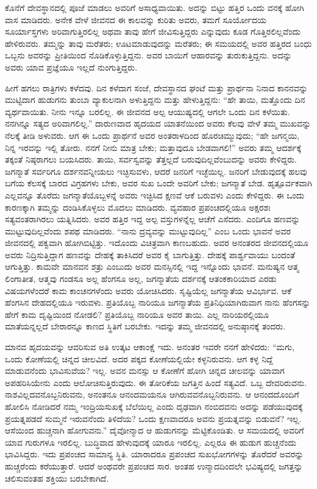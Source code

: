 ಕೊನೆಗೆ ದೇವಸ್ಥಾನದಲ್ಲಿ ಪೂಜೆ ಮಾಡಲು ಅವರಿಗೆ ಅಸಾಧ್ಯವಾಯಿತು. ಅದನ್ನು ಬಿಟ್ಟು ಹತ್ತಿರ ಒಂದು ವನಕ್ಕೆ ಹೋಗಿ ವಾಸ ಮಾಡಿದರು. ಅನೇಕ ವೇಳೆ ಜೀವನದ ಈ ಕಾಲವನ್ನು ಕುರಿತು ಅವರು, ತಮಗೆ ಸೂರ್ಯೋದಯ ಸೂರ್ಯಾಸ್ತಗಳು ಅರಿವಾಗುತ್ತಿರಲಿಲ್ಲ ಅಥವಾ ತಾವು ಹೇಗೆ ಜೀವಿಸುತ್ತಿದ್ದರು ಎನ್ನುವುದು ಕೂಡ ಗೊತ್ತಿರಲಿಲ್ಲವೆಂದು ಹೇಳಿರುವರು. ತಮ್ಮನ್ನು ತಾವು ಮರೆತರು; ಊಟಮಾಡುವುದನ್ನು ಮರೆತರು; ಈ ಸಮಯದಲ್ಲಿ ಅವರ ಹತ್ತಿರದ ಬಂಧು ಒಬ್ಬನು ಅವರನ್ನು ಪ್ರೀತಿಯಿಂದ ನೊಡಿಕೊಳ್ಳುತ್ತಿದ್ದನು. ಅವರ ಬಾಯಿಗೆ ಆಹಾರವನ್ನು ತುರುಕುತ್ತಿದ್ದನು. ಅದನ್ನು ಅವರು ಯಾವ ಪ್ರಜ್ಞೆಯೂ ಇಲ್ಲದೆ ನುಂಗುತ್ತಿದ್ದರು.

ಹೀಗೆ ಹಗಲು ರಾತ್ರಿಗಳು ಕಳೆದವು. ದಿನ ಕಳೆದಾಗ ಸಂಜೆ, ದೇವಸ್ಥಾನದ ಘಂಟೆ ಮತ್ತು ಪ್ರಾರ್ಥನಾ ನಿನಾದ ಕಾನನವನ್ನು ಮುಟ್ಟಿದಾಗ ಹುಡುಗನು ತುಂಬಾ ವ್ಯಾಕುಲನಾಗಿ ಅಳುತ್ತಿದ್ದನು ಮತ್ತು ಹೇಳುತ್ತಿದ್ದನು: “ಹೇ ತಾಯಿ, ಮತ್ತೊಂದು ದಿನ ವ್ಯರ್ಥವಾಯಿತು. ನೀನು ಇನ್ನೂ ಬರಲಿಲ್ಲ. ಈ ಜೀವನದ ಅಲ್ಪ ಆಯುಷ್ಯದಲ್ಲಿ ಆಗಲೇ ಒಂದು ದಿನ ಕಳೆಯಿತು. ನನಗಿನ್ನೂ ಸತ್ಯದ ಅರಿವಾಗಲಿಲ್ಲ.” ದಾರುಣವಾದ ಹೃದಯದ ಯಾತನೆಯಿಂದ ಅವರು ಕೆಲವು ವೇಳೆ ತಮ್ಮ ಮುಖವನ್ನು ನೆಲಕ್ಕೆ ತೀಡಿ ಅಳುವರು. ಆಗ ಈ ಒಂದು ಪ್ರಾರ್ಥನೆ ಅವರ ಅಂತರಾಳದಿಂದ ಹೊರಚಿಮ್ಮುವುದು; “ಹೇ ಜಗನ್ಮಯಿ, ನಿನ್ನ ಇರವನ್ನು ಇಲ್ಲಿ ತೋರು. ನನಗೆ ನೀನು ಮಾತ್ರ ಬೇಕು; ಮತ್ತಾವುದೂ ಬೇಡವಾಗಲಿ!” ಅವರು ತಮ್ಮ ಆದರ್ಶಕ್ಕೆ ತಕ್ಕಂತೆ ನಿಷ್ಠರಾಗಲು ಬಯಸಿದರು. ತಾಯಿ, ಸರ್ವಸ್ವವನ್ನು ತೆತ್ತಲ್ಲದೆ ಬರುವುದಿಲ್ಲವೆಂಬುದನ್ನು ಅವರು ಕೇಳಿದ್ದರು. ಜಗನ್ಮಾತೆ ಸರ್ವರಿಗೂ ದರ್ಶನವನ್ನೀಯಲು ಇಚ್ಛಿಸುವಳು, ಆದರೆ ಜನರಿಗೆ ಇಚ್ಛೆಯಿಲ್ಲ. ಜನರಿಗೆ ಬೇಡುವುದಕ್ಕೆ ಹಲವು ಬಗೆಯ ಕೆಲಸಕ್ಕೆ ಬಾರದ ವಿಗ್ರಹಗಳು ಬೇಕು, ಅವರ ಸುಖ ಒಂದೇ ಅವರಿಗೆ ಬೇಕು; ಜಗನ್ಮಾತೆ ಬೇಡ. ಹೃತ್ಪೂರ್ವಕವಾಗಿ ಎಲ್ಲವನ್ನೂ ತೊರೆದು ಜಗನ್ಮಾತೆಯೊಬ್ಬಳನ್ನೆ ಅವರು ಇಚ್ಛಿಸಿದ ಕ್ಷಣವೆ ಆಕೆ ಬರುವಳು ಎಂದು ಕೇಳಿದ್ದರು. ಈ ಒಂದು ಕಾರಣಕ್ಕಾಗಿ ತಮ್ಮನ್ನು ದಂಡಿಸಿಕೊಳ್ಳಲು ಮೊದಲು ಮಾಡಿದರು. ವ್ಯವಹಾರ ಪ್ರಪಂಚದಲ್ಲಿಯೂ ಅಕ್ಷರಶಃ ಸತ್ಯವಂತರಾಗಿರಲು ಯತ್ನಿಸಿದರು. ಅವರ ಹತ್ತಿರ ಇದ್ದ ಅಲ್ಪ ವಸ್ತುಗಳನ್ನೆಲ್ಲ ಆಚೆಗೆ ಎಸೆದರು. ಎಂದಿಗೂ ಹಣವನ್ನು ಮುಟ್ಟುವುದಿಲ್ಲವೆಂದು ಶಪಥ ಮಾಡಿದರು. “ನಾನು ದ್ರವ್ಯವನ್ನು ಮುಟ್ಟುವುದಿಲ್ಲ” ಎಂಬ ಒಂದು ಭಾವನೆ ಅವರ ಜೀವನದಲ್ಲಿ ಪಕ್ವವಾಗಿ ಹೋಗಿಬಿಟ್ಟಿತ್ತು. ಇದೊಂದು ವಿಚಿತ್ರವಾಗಿ ಕಾಣಬಹುದು. ಅವರ ಅನಂತರದ ಜೀವನದಲ್ಲಿಯೂ ಅವರು ನಿದ್ರಿಸುತ್ತಿದ್ದಾಗ ಹಣವನ್ನು ದೇಹಕ್ಕೆ ತಾಕಿಸಿದರೆ ಅವರ ಕೈ ಬಾಗುತ್ತಿತ್ತು. ದೇಹಕ್ಕೆ ಪಾರ್ಶ್ವವಾಯು ಬಂದಂತೆ ಆಗುತ್ತಿತ್ತು. ಕಾಮವೇ ಮಾನವನ ಶತ್ರು ಎಂಬುದು ಅವರ ಮನಸ್ಸಿನಲ್ಲಿ ಇದ್ದ ಇನ್ನೊಂದು ಭಾವನೆ. ಮನುಷ್ಯನ ಆತ್ಮ ಲಿಂಗಾತೀತ, ಆತ್ಮವು ಗಂಡಸೂ ಅಲ್ಲ ಹೆಂಗಸೂ ಅಲ್ಲ, ಜಗನ್ಮಾತೆಯ ದರ್ಶನಕ್ಕೆ ಆತಂಕಕಾರಿಯಾದ ಎರಡು ವಿಷಯಗಳೆಂದರೆ ಕಾಮ ಕಾಂಚನಗಳೆಂದು ಅವರು ಯೋಚಿಸಿದರು. ಸೃಷ್ಟಿಯೆಲ್ಲ ಜಗನ್ಮಾತೆಯ ಆವಿರ್ಭಾವ. ಆಕೆ ಹೆಂಗಸಿನ ದೇಹದಲ್ಲಿಯೂ ಇರುವಳು. ಪ್ರತಿಯೊಬ್ಬ ನಾರಿಯೂ ಜಗನ್ಮಾತೆಯ ಪ್ರತಿನಿಧಿಯಾಗಿರುವಾಗ ನಾನು ಹೆಂಗಸನ್ನು ಹೇಗೆ ಕಾಮ ದೃಷ್ಟಿಯಿಂದ ನೋಡಲಿ? ಪ್ರತಿಯೊಬ್ಬ ನಾರಿಯೂ ಅವರ ತಾಯಿ. ಎಲ್ಲ ನಾರಿಯರಲ್ಲಿಯೂ ಮಾತೆಯನ್ನಲ್ಲದೆ ಬೇರಾರನ್ನೂ ಕಾಣದ ಸ್ಥಿತಿಗೆ ಬರಬೇಕು. ಇದನ್ನು ತಮ್ಮ ಜೀವನದಲ್ಲಿ ಅನುಷ್ಠಾನಕ್ಕೆ ತಂದರು.

ಮಾನವ ಹೃದಯವನ್ನು ಆವರಿಸುವ ಅತಿ ಉತ್ಕಟ ಆಕಾಂಕ್ಷೆ ಇದು. ಅನಂತರ ಇವರೇ ನನಗೆ ಹೇಳಿದರು: “ಮಗು, ಒಂದು ಕೋಣೆಯಲ್ಲಿ ಚಿನ್ನದ ಚೀಲವಿದೆ. ಅದರ ಪಕ್ಕದ ಕೋಣೆಯಲ್ಲಿಯೇ ಕಳ್ಳನಿರುವನು. ಆಗ ಕಳ್ಳ ನಿದ್ದೆ ಮಾಡುವನೆಂದು ಭಾವಿಸುವೆಯ? ಇಲ್ಲ. ಅವನ ಮನಸ್ಸು ಆ ಕೋಣೆಗೆ ಹೋಗಿ ಚಿನ್ನದ ಚೀಲವನ್ನು ಯಾವಾಗ ಅಪಹರಿಸಿಯೇನು ಎಂದು ಆಲೋಚಿಸುತ್ತಿರುವುದು. ಈ ತೋರಿಕೆಯ ಜಗತ್ತಿನ ಹಿಂದೆ ಸತ್ಯವಿದೆ. ಒಬ್ಬ ದೇವರಿರುವನು. ನಾಶವಿಲ್ಲದವನೊಬ್ಬನಿರುವನು, ಅನಂತನೂ ಆನಂದಮಯನೂ ಆಗಿರುವವನೊಬ್ಬನಿರುವನು. ಆ ಆನಂದದೊಂದಿಗೆ ಹೋಲಿಸಿ ನೋಡಿದರೆ ನಮ್ಮ ಇಂದ್ರಿಯಸುಖಕ್ಕೆ ಬೆಲೆಯಿಲ್ಲ ಎಂದು ದೃಢವಾಗಿ ನಂಬಿದವನು ಅದನ್ನು ಪಡೆಯುವುದಕ್ಕೆ ಪ್ರಯತ್ನಪಡದೆ ಸುಮ್ಮನೆ ಇರುವನೆಂದು ತಿಳಿದೆಯ? ಒಂದು ಕ್ಷಣವಾದರೂ ಅವನು ಪ್ರಯತ್ನವನ್ನು ಬಿಡುವನೆ? ಇಲ್ಲ. ಆಸೆಯಿಂದ ಹುಚ್ಚನಾಗಿ ಹೋಗುವನು.” ದೈವೋನ್ಮಾದ ಆ ಹುಡುಗನನ್ನು ಮೆಟ್ಟಿಕೊಂಡಿತು. ಆ ಸಮಯದಲ್ಲಿ ಅವರಿಗೆ ಯಾವ ಗುರುಗಳೂ ಇರಲಿಲ್ಲ. ಬುದ್ಧಿವಾದ ಹೇಳುವುದಕ್ಕೆ ಯಾರೂ ಇರಲಿಲ್ಲ. ಎಲ್ಲರೂ ಈ ಹುಡುಗ ಹುಚ್ಚನೆಂದು ಭಾವಿಸಿದ್ದರು. ಇದು ಪ್ರಪಂಚದ ಸಾಮಾನ್ಯ ಸ್ಥಿತಿ. ಯಾರಾದರೂ ಪ್ರಪಂಚದ ಸುಖಭೋಗಗಳನ್ನು ತೊರೆದರೆ ಅವರನ್ನು ಹುಚ್ಚರೆಂದು ಕರೆಯುತ್ತಾರೆ. ಆದರೆ ಅಂಥವರೇ ಪ್ರಪಂಚದ ಸಾರ. ಅಂತಹ ಉನ್ಮಾದದಿಂದಲೇ ಭವಿಷ್ಯದಲ್ಲಿ ಜಗತ್ತನ್ನು ಚಲಿಸುವಂತಹ ಶಕ್ತಿಯು ಬರಬೇಕಾಗಿದೆ.

